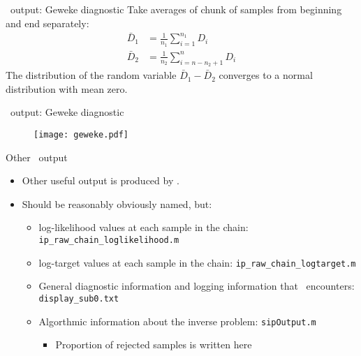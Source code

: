 \begin{frame}[fragile]{\Queso\ output: Geweke diagnostic}
  Take averages of chunk of samples from beginning and end separately:
  \begin{align*}
    \bar{D}_1 &= \frac{1}{n_1} \sum_{i=1}^{n_1} D_i \\
    \bar{D}_2 &= \frac{1}{n_2} \sum_{i=n - n_2 + 1}^{n} D_i
  \end{align*}
  The distribution of the random variable $\bar{D}_1 - \bar{D}_2$ converges to
  a normal distribution with mean zero.
\end{frame}

\begin{frame}[fragile]{\Queso\ output: Geweke diagnostic}
  \begin{figure}
    \begin{center}
      \texttt{[image: geweke.pdf]}
    \end{center}
  \end{figure}
\end{frame}

\begin{frame}[fragile]{Other \Queso\ output}
  \begin{itemize}
    \item Other useful output is produced by \Queso.
    \item Should be reasonably obviously named, but:
      \begin{itemize}
        \item log-likelihood values at each sample in the chain:
          \texttt{ip\_raw\_chain\_loglikelihood.m}
        \item log-target values at each sample in the chain:
          \texttt{ip\_raw\_chain\_logtarget.m}
        \item General diagnostic information and logging information that
          \Queso\ encounters:
          \texttt{display\_sub0.txt}
        \item Algorthmic information about the inverse problem:
          \texttt{sipOutput.m}
          \begin{itemize}
            \item Proportion of rejected samples is written here
          \end{itemize}
      \end{itemize}
  \end{itemize}
\end{frame}
